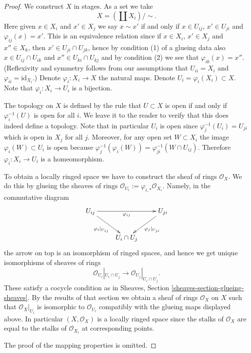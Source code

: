 \begin{proof}
We construct $X$ in stages.
As a set we take
$$
X = (\coprod X_i) / \sim.
$$
Here given $x \in X_i$ and $x' \in X_j$ we say
$x \sim x'$ if and only if $x \in U_{ij}$, $x' \in U_{ji}$
and $\varphi_{ij}(x) = x'$. This is an equivalence relation
since if $x \in X_i$, $x' \in X_j$ and $x'' \in X_k$, then
$x' \in U_{ji} \cap U_{jk}$, hence by condition (1) of
a glueing data also $x \in U_{ij} \cap U_{ik}$ and
$x'' \in U_{ki} \cap U_{kj}$ and by condition (2)
we see that $\varphi_{ik}(x) = x''$. (Reflexivity and symmetry
follows from our assumptions that $U_{ii} = X_i$ and
$\varphi_{ii} = \text{id}_{X_i}$.)
Denote $\varphi_i : X_i \to X$
the natural maps. Denote $U_i = \varphi_i(X_i) \subset X$.
Note that $\varphi_i : X_i \to U_i$ is a bijection.

\medskip\noindent
The topology on $X$ is defined by the rule that
$U \subset X$ is open if and only if $\varphi_i^{-1}(U)$
is open for all $i$. We leave it to the reader to verify
that this does indeed define a topology.
Note that in particular $U_i$ is open since $\varphi_j^{-1}(U_i)
= U_{ji}$ which is open in $X_j$ for all $j$.
Moreover, for any open set $W \subset X_i$ the image
$\varphi_i(W) \subset U_i$ is open because
$\varphi_j^{-1}(\varphi_i(W)) = \varphi_{ji}^{-1}(W \cap U_{ij})$.
Therefore $\varphi_i : X_i \to U_i$ is a homeomorphism.

\medskip\noindent
To obtain a locally ringed space we have to construct the
sheaf of rings $\mathcal{O}_X$. We do this by glueing the
sheaves of rings $\mathcal{O}_{U_i} := \varphi_{i, *} \mathcal{O}_{X_i}$.
Namely, in the commutative diagram
$$
\xymatrix{
U_{ij} \ar[rr]_{\varphi_{ij}} \ar[rd]_{\varphi_i|_{U_{ij}}}
& &
U_{ji} \ar[ld]^{\varphi_j|_{U_{ji}}} \\
& U_i \cap U_j &
}
$$
the arrow on top is an isomorphism of ringed spaces,
and hence we get unique isomorphisms of sheaves of rings
$$
\mathcal{O}_{U_i}|_{U_i \cap U_j}
\longrightarrow
\mathcal{O}_{U_j}|_{U_i \cap U_j}.
$$
These satisfy a cocycle condition as in Sheaves,
Section \ref{sheaves-section-glueing-sheaves}.
By the results of that section we obtain a sheaf of rings
$\mathcal{O}_X$ on $X$ such that $\mathcal{O}_X|_{U_i}$
is isomorphic to $\mathcal{O}_{U_i}$ compatibly with
the glueing maps displayed above.
In particular $(X, \mathcal{O}_X)$ is a locally ringed
space since the stalks of $\mathcal{O}_X$ are equal
to the stalks of $\mathcal{O}_{X_i}$ at corresponding
points.

\medskip\noindent
The proof of the mapping properties is omitted.
\end{proof}

